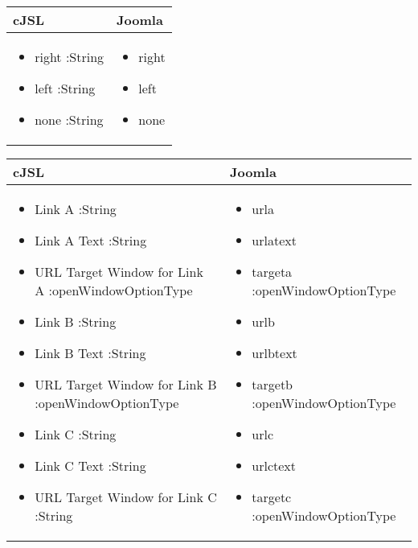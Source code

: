 \begin{minipage}{0.7\textwidth}
\begin{tabular}{|p{} | p{}|}
\hline
\textbf{cJSL} & \textbf{Joomla} \\ 
\hline
\begin{itemize}
\item right :String
\item left :String
\item none :String
\end{itemize}
 & 
\begin{itemize}
\item right
\item left
\item none
\end{itemize}
\\
\hline
\end{tabular}
\end{minipage}

\begin{minipage}{0.7\textwidth}
\begin{tabular}{|p{} | p{}|}
\hline
\textbf{cJSL} & \textbf{Joomla} \\ 
\hline
\begin{itemize}
\item Link A :String 
\item Link A Text :String 
\item URL Target Window for Link A :openWindowOptionType
\item Link B :String 
\item Link B Text :String 
\item URL Target Window for Link B :openWindowOptionType
\item Link C :String 
\item Link C Text :String 
\item URL Target Window for Link C :String 
\end{itemize}
 & 
\begin{itemize}
\item urla 
\item urlatext 
\item targeta :openWindowOptionType
\item urlb 
\item urlbtext 
\item targetb :openWindowOptionType
\item urlc 
\item urlctext 
\item targetc :openWindowOptionType
\end{itemize}
\\
\hline
\end{tabular}
\end{minipage}

